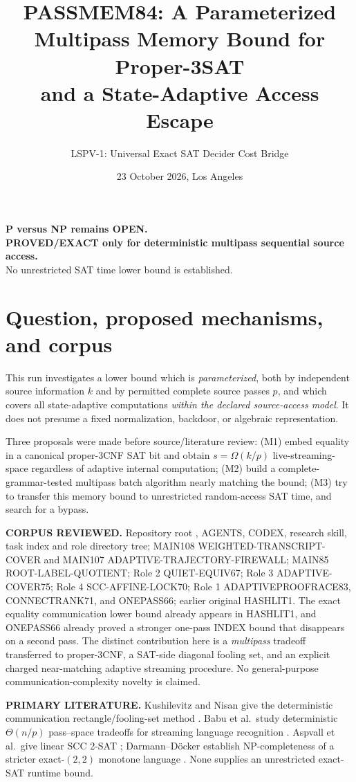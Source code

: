 \documentclass[11pt]{article}
\title{PASSMEM84: A Parameterized Multipass Memory Bound for Proper-3SAT\\and a State-Adaptive Access Escape}
\author{LSPV-1: Universal Exact SAT Decider Cost Bridge}
\date{23 October 2026, Los Angeles}
\begin{document}
\maketitle
\begin{center}
\textbf{P versus NP remains OPEN.}\\
\textbf{PROVED/EXACT only for deterministic multipass sequential source access.}\\
No unrestricted SAT time lower bound is established.
\end{center}
\section{Question, proposed mechanisms, and corpus}
This run investigates a lower bound which is \emph{parameterized}, both by independent source information $k$ and by permitted complete source passes $p$, and which covers all state-adaptive computations \emph{within the declared source-access model}. It does not presume a fixed normalization, backdoor, or algebraic representation.

Three proposals were made before source/literature review: (M1) embed equality in a canonical proper-3CNF SAT bit and obtain $s=\Omega(k/p)$ live-streaming-space regardless of adaptive internal computation; (M2) build a complete-grammar-tested multipass batch algorithm nearly matching the bound; (M3) try to transfer this memory bound to unrestricted random-access SAT time, and search for a bypass.

\textbf{CORPUS REVIEWED.} Repository root , AGENTS, CODEX, research skill, task index and role directory tree; MAIN108 WEIGHTED-TRANSCRIPT-COVER and MAIN107 ADAPTIVE-TRAJECTORY-FIREWALL; MAIN85 ROOT-LABEL-QUOTIENT; Role 2 QUIET-EQUIV67; Role 3 ADAPTIVE-COVER75; Role 4 SCC-AFFINE-LOCK70; Role 1 ADAPTIVEPROOFRACE83, CONNECTRANK71, and ONEPASS66; earlier original HASHLIT1. The exact equality communication lower bound already appears in HASHLIT1, and ONEPASS66 already proved a stronger one-pass INDEX bound that disappears on a second pass. The distinct contribution here is a \emph{multipass} tradeoff transferred to proper-3CNF, a SAT-side diagonal fooling set, and an explicit charged near-matching adaptive streaming procedure. No general-purpose communication-complexity novelty is claimed.

\textbf{PRIMARY LITERATURE.} Kushilevitz and Nisan give the deterministic communication rectangle/fooling-set method \cite{kn}. Babu et al.\ study deterministic $\Theta(n/p)$ pass--space tradeoffs for streaming language recognition \cite{babu}. Aspvall et al.\ give linear SCC 2-SAT \cite{apt}; Darmann--D\"ocker establish NP-completeness of a stricter exact-$(2,2)$ monotone language \cite{dock}. None supplies an unrestricted exact-SAT runtime bound.
\end{document}
